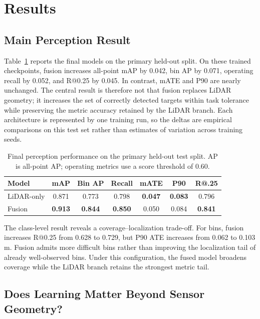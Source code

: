 \documentclass[conference]{IEEEtran}
\begin{document}
\section{Results}

\subsection{Main Perception Result}

Table~\ref{tab:main} reports the final models on the primary held-out split. On these trained checkpoints, fusion increases all-point mAP by 0.042, bin AP by 0.071, operating recall by 0.052, and R@0.25 by 0.045. In contrast, mATE and P90 are nearly unchanged. The central result is therefore not that fusion replaces LiDAR geometry; it increases the set of correctly detected targets within task tolerance while preserving the metric accuracy retained by the LiDAR branch. Each architecture is represented by one training run, so the deltas are empirical comparisons on this test set rather than estimates of variation across training seeds.

\begin{table}[t]
\caption{Final perception performance on the primary held-out test split. AP is all-point AP; operating metrics use a score threshold of 0.60.}
\label{tab:main}
\centering
\scriptsize
\setlength{\tabcolsep}{2.6pt}
\begin{tabular}{lcccccc}
\toprule
\textbf{Model} & \textbf{mAP} & \textbf{Bin AP} &
\textbf{Recall} & \textbf{mATE} & \textbf{P90} & \textbf{R@.25} \\
\midrule
LiDAR-only & 0.871 & 0.773 & 0.798 & \textbf{0.047} & \textbf{0.083} & 0.796 \\
Fusion & \textbf{0.913} & \textbf{0.844} & \textbf{0.850} & 0.050 & 0.084 & \textbf{0.841} \\
\bottomrule
\end{tabular}
\end{table}

The class-level result reveals a coverage--localization trade-off. For bins, fusion increases R@0.25 from 0.628 to 0.729, but P90 ATE increases from 0.062 to 0.103\,m. Fusion admits more difficult bins rather than improving the localization tail of already well-observed bins. Under this configuration, the fused model broadens coverage while the LiDAR branch retains the strongest metric tail.

\subsection{Does Learning Matter Beyond Sensor Geometry?}
\end{document}
